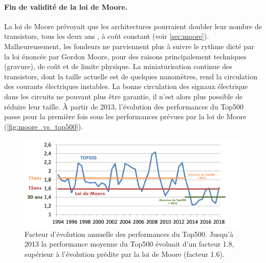       
        \paragraph{Fin de validité de la loi de Moore.}\label{sec:end_mooore} 
            
            La loi de Moore \cite{Moore1998} prévoyait que les architectures pourraient doubler leur nombre de transistors, tous les deux ans \cite{Moore75}, à coût constant (voir \autoref{sec:moore}). Malheureusement, les fondeurs ne parviennent plus à suivre le rythme dicté par la loi énoncée par Gordon Moore, pour des raisons principalement techniques (gravure), de coût \cite{Brooks2017} et de limite physique. La miniaturisation continue des transistors, dont la taille actuelle est de quelques nanomètres, rend la circulation des courants électriques instables. La bonne circulation des signaux électrique dans les circuits ne pouvant plus être garantie, il n'est alors plus possible de réduire leur taille.
            À partir de 2013, l'évolution des performances du Top500 passe pour la première fois sous les performances prévues par la loi de Moore (\autoref{fig:moore_vs_top500}).
            

            \begin{figure}
            \center
            \includegraphics[width=16cm]{images/moore_vs_top500.png}
            \caption{\label{fig:moore_vs_top500}
             Facteur d'évolution annuelle des performances du Top500\protect\footnotemark. Jusqu'à 2013 la performance moyenne du Top500 évoluait d'un facteur 1.8, supérieur à l'évolution prédite par la loi de Moore (facteur 1.6). }
                \end{figure}

